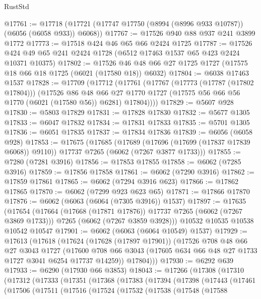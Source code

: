 \begin{lexlean}{RustStd}
\begin{coremodule}
@17761 := @17718 (@17721 (@17747 @17750 (@8994 (@8996 @933 @10787)) (@6056 (@6058 @933)) @6068))
@17767 := @17526 @940 @88 @937 @241 @3899 @1772
@17773 := @17518 @424 @46 @65 @66 @2424 @1725
@17787 := @17526 @424 @49 @65 @241 @2424 @1728 (@6512 @17463 @1537 @65 @423 @2424 @10371 @10375)
@17802 := @17526 @46 @48 @66 @27 @1725 @1727 (@17575 @18 @66 @18 @1725 (@6021 (@17580 @18)) @6032)
@17804 := @6038 @17463 @1537
@17828 := @17709
    (@17712
      (@17761
        (@17767
          (@17773 (@17787 (@17802 @17804)))
          (@17526
            @86
            @48
            @66
            @27
            @1770
            @1727
            (@17575 @56 @66 @56 @1770 (@6021 (@17580 @56)) @6281)
            @17804))))
@17829 := @5607 @928
@17830 := @5803 @17829
@17831 := @17828 @17830
@17832 := @5677 @1305
@17833 := @6047 @17832
@17834 := @17831 @17833
@17835 := @5701 @1305
@17836 := @6051 @17835
@17837 := @17834 @17836
@17839 := @6056 (@6058 @928)
@17853 := @17675
    (@17685
      (@17689 (@17696 (@17699 (@17837 @17839 @6068)) @9110))
      @17737
      @7265
      (@6062 (@7267 @3877 @1733)))
@17855 := @7280 (@7281 @3916)
@17856 := @17853 @17855
@17858 := @6062 (@7285 @3916)
@17859 := @17856 @17858
@17861 := @6062 (@7290 @3916)
@17862 := @17859 @17861
@17865 := @6062 (@7294 @3916 @623)
@17866 := @17862 @17865
@17870 := @6062 (@7299 @923 @623 @65)
@17871 := @17866 @17870
@17876 := @6062 (@6063 (@6064 (@7305 @3916)) @1537)
@17897 := @17635
    (@17654
      (@17664 (@17668 (@17871 @17876)) @17737 @7265 (@6062 (@7267 @3869 @1733)))
      @7265
      (@6062 (@7267 @3859 @3928)))
    @10532
    @10535
    @10538
    @10542
    @10547
@17901 := @6062 (@6063 (@6064 @10549) @1537)
@17929 := @17613
    (@17618
      (@17624
        (@17628 (@17897 @17901))
        (@17526
          @708
          @48
          @66
          @27
          @3043
          @1727
          (@17600 @708 @66 @3043 (@17605 @634 @66 @48 @27 @1733 @1727 @3041 @6254 @17737 @14259))
          @17804)))
@17930 := @6292 @639
@17933 := @6290 (@17930 @66 @3853)
@18043 := @17266
    (@17308
      (@17310
        (@17312
          (@17333
            (@17351
              (@17368
                (@17383
                  (@17394
                    (@17398
                      (@17443
                        (@17461
                          (@17506
                            (@17511
                              (@17516
                                (@17524
                                  (@17532
                                    (@17538
                                      (@17548
                                        (@17588

\end{coremodule}
\end{lexlean}
